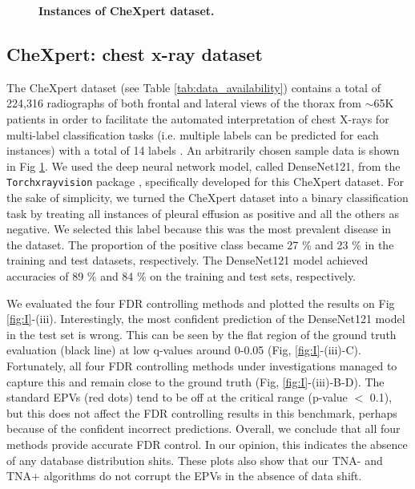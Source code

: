 \documentclass[10pt,letterpaper]{article}
\begin{document}
\begin{figure}[h!]
	\centering
	\caption{{\bf Instances of CheXpert dataset.}}
	\label{fig:CheXpert_example}
\end{figure} 

\subsection*{CheXpert: chest x-ray dataset}

The CheXpert dataset (see Table \ref{tab:data_availability}) contains a total of 224,316 radiographs of both frontal and lateral views of the thorax from $\sim$65K patients in order to facilitate the automated interpretation of chest X-rays for multi-label classification tasks (i.e. multiple labels can be predicted for each instances) with a total of 14 labels \cite{irvin2019chexpert}.
An arbitrarily chosen sample data is shown in Fig \ref{fig:CheXpert_example}.
We used the deep neural network model, called DenseNet121, from the \texttt{Torchxrayvision} package \cite{cohen2020limits,Cohen2022xrv}, specifically developed for this CheXpert dataset.
For the sake of simplicity, we turned the CheXpert dataset into a binary classification task by treating all instances of pleural effusion as positive and all the others as negative.
We selected this label because this was the most prevalent  disease in the dataset.
The proportion of the positive class became 27 \% and 23 \% in the training and test datasets, respectively.
The DenseNet121 model achieved accuracies of 89 \% and 84 \% on the training and test sets, respectively.

We evaluated the four FDR controlling methods and plotted the results on Fig \ref{fig:I}-(iii).
Interestingly, the most confident prediction of the DenseNet121 model in the test set is wrong.
This can be seen by the flat region of the ground truth evaluation (black line) at low q-values around 0-0.05 (Fig, \ref{fig:I}-(iii)-C).
Fortunately, all four FDR controlling methods under investigations managed to capture this and remain close to the ground truth (Fig, \ref{fig:I}-(iii)-B-D).
The standard EPVs (red dots) tend to be off at the critical range (p-value $<$ 0.1), but this does not affect the FDR controlling results in this benchmark, perhaps because of the confident incorrect predictions.
Overall, we conclude that all four methods provide accurate FDR control.
In our opinion, this indicates the absence of any database distribution shits.
These plots also show that our TNA- and TNA+ algorithms do not corrupt  the EPVs in the absence of data shift.
\end{document}
